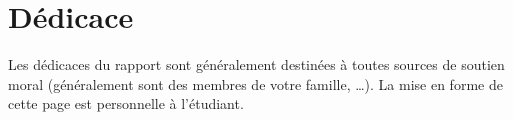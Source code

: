 \chapter*{Dédicace}
Les dédicaces du rapport sont généralement destinées à toutes sources de soutien moral
(généralement sont des membres de votre famille, …).
La mise en forme de cette page est personnelle à l’étudiant.